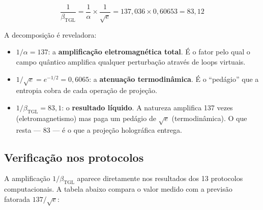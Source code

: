 \documentclass[12pt,a4paper,twoside]{article}
\newcommand{\betatgl}{\beta_{\!\scriptscriptstyle\mathrm{TGL}}}
\begin{document}
\begin{equationbox}[title={Amplificação Decomposta}]
\begin{equation}
\boxed{\frac{1}{\betatgl} = \frac{1}{\alpha} \times \frac{1}{\sqrt{e}} = 137{,}036 \times 0{,}60653 = 83{,}12}
\label{eq:amplificacao}
\end{equation}
\end{equationbox}

A decomposição é reveladora:

\begin{itemize}[nosep]
\item $1/\alpha = 137$: a \textbf{amplificação eletromagnética total}. É o fator pelo qual o campo quântico amplifica qualquer perturbação através de loops virtuais.

\item $1/\sqrt{e} = e^{-1/2} = 0{,}6065$: a \textbf{atenuação termodinâmica}. É o ``pedágio'' que a entropia cobra de cada operação de projeção.

\item $1/\betatgl = 83{,}1$: o \textbf{resultado líquido}. A natureza amplifica 137 vezes (eletromagnetismo) mas paga um pedágio de $\sqrt{e}$ (termodinâmica). O que resta --- 83 --- é o que a projeção holográfica entrega.
\end{itemize}

\subsection{Verificação nos protocolos}

A amplificação $1/\betatgl$ aparece diretamente nos resultados dos 13 protocolos computacionais. A tabela abaixo compara o valor medido com a previsão fatorada $137/\sqrt{e}$:
\end{document}
